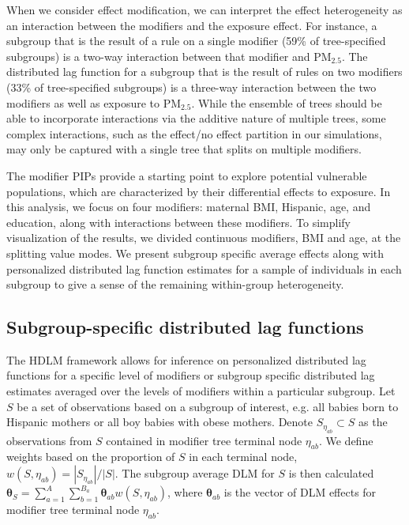 \documentclass[12pt]{article}
\begin{document}
When we consider effect modification, we can interpret the effect heterogeneity as an interaction between the modifiers and the exposure effect. For instance, a subgroup that is the result of a rule on a single modifier (59\% of tree-specified subgroups) is a two-way interaction between that modifier and PM$_{2.5}$. The distributed lag function for a subgroup that is the result of rules on two modifiers (33\% of tree-specified subgroups) is a three-way interaction between the two modifiers as well as exposure to PM$_{2.5}$. While the ensemble of trees should be able to incorporate interactions via the additive nature of multiple trees, some complex interactions, such as the effect/no effect partition in our simulations, may only be captured with a single tree that splits on multiple modifiers.

The modifier PIPs provide a starting point to explore potential vulnerable populations, which are characterized by their differential effects to exposure. In this analysis, we focus on four modifiers: maternal BMI, Hispanic, age, and education, along with interactions between these modifiers. To simplify visualization of the results, we divided continuous modifiers, BMI and age, at the splitting value modes. We present subgroup specific average effects along with personalized distributed lag function estimates for a sample of individuals in each subgroup to give a sense of the remaining within-group heterogeneity.


\subsection{Subgroup-specific distributed lag functions}
\label{sec:subgroup-analysis}
The HDLM framework allows for inference on personalized distributed lag functions for a specific level of modifiers or subgroup specific distributed lag estimates averaged over the levels of modifiers within a particular subgroup. Let $S$ be a set of observations based on a subgroup of interest, e.g. all babies born to Hispanic mothers or all boy babies with obese mothers. Denote $S_{\eta_{ab}}\subset S$ as the observations from $S$ contained in modifier tree terminal node $\eta_{ab}$. We define weights based on the proportion of $S$ in each terminal node, $w(S,\eta_{ab})=|S_{\eta_{ab}}|\big/|S|$. The subgroup average DLM for $S$ is then calculated $\boldsymbol\theta_S=\sum_{a=1}^A\sum_{b=1}^{B_a}\boldsymbol\theta_{ab}w(S,\eta_{ab})$, where $\boldsymbol\theta_{ab}$ is the vector of DLM effects for modifier tree terminal node $\eta_{ab}$.
\end{document}
